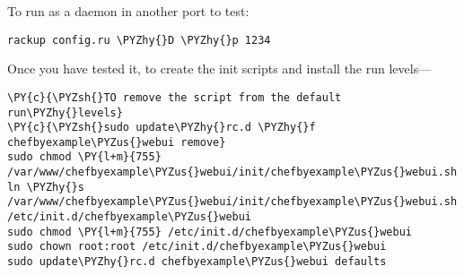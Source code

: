 To run as a daemon in another port to test:
\begin{codelisting}
\label{code:}
\codecaption{}
\begin{Verbatim}[fontsize=\relsize{-2.5},fontseries=b,commandchars=\\\{\}]
rackup config.ru \PYZhy{}D \PYZhy{}p 1234
\end{Verbatim}
\end{codelisting}

Once you have tested it, to create the init scripts and install the run levels---
\begin{codelisting}
\label{code:}
\codecaption{}
\begin{Verbatim}[fontsize=\relsize{-2.5},fontseries=b,commandchars=\\\{\}]
\PY{c}{\PYZsh{}TO remove the script from the default run\PYZhy{}levels}
\PY{c}{\PYZsh{}sudo update\PYZhy{}rc.d \PYZhy{}f chefbyexample\PYZus{}webui remove}
sudo chmod \PY{l+m}{755} /var/www/chefbyexample\PYZus{}webui/init/chefbyexample\PYZus{}webui.sh
ln \PYZhy{}s /var/www/chefbyexample\PYZus{}webui/init/chefbyexample\PYZus{}webui.sh /etc/init.d/chefbyexample\PYZus{}webui
sudo chmod \PY{l+m}{755} /etc/init.d/chefbyexample\PYZus{}webui
sudo chown root:root /etc/init.d/chefbyexample\PYZus{}webui
sudo update\PYZhy{}rc.d chefbyexample\PYZus{}webui defaults
\end{Verbatim}
\end{codelisting}